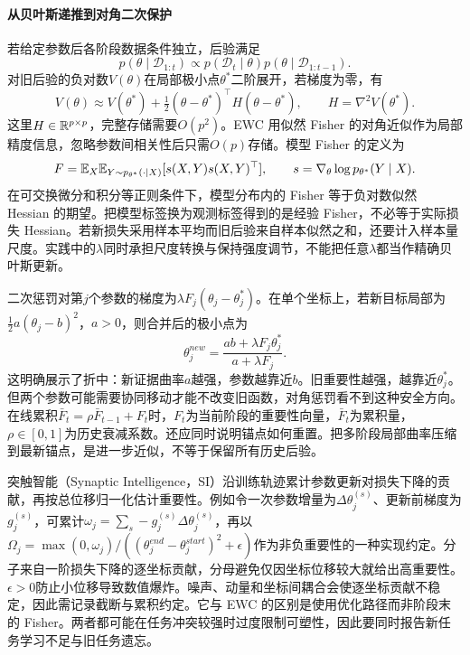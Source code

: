 \paragraph{从贝叶斯递推到对角二次保护}
若给定参数后各阶段数据条件独立，后验满足
\begin{equation}
 p(\theta\mid\mathcal D_{1:t})\propto p(\mathcal D_t\mid\theta)
 p(\theta\mid\mathcal D_{1:t-1}).
\end{equation}
对旧后验的负对数$V(\theta)$在局部极小点$\theta^*$二阶展开，若梯度为零，有
\begin{equation}
 V(\theta)\approx V(\theta^*)+\tfrac12(\theta-\theta^*)^\top H(\theta-\theta^*),
 \qquad H=\nabla^2V(\theta^*).
\end{equation}
这里$H\in\mathbb{R}^{p\times p}$，完整存储需要$O(p^2)$。EWC 用似然 Fisher 的对角近似作为局部精度信息，忽略参数间相关性后只需$O(p)$存储。模型 Fisher 的定义为
\begin{equation}
 F=\mathbb{E}_{X}\mathbb{E}_{Y\sim p_{\theta^*}(\cdot\mid X)}[s(X,Y)s(X,Y)^\top],
 \qquad s=\nabla_\theta\log p_{\theta^*}(Y\mid X).
\end{equation}
在可交换微分和积分等正则条件下，模型分布内的 Fisher 等于负对数似然 Hessian 的期望。把模型标签换为观测标签得到的是经验 Fisher，不必等于实际损失 Hessian。若新损失采用样本平均而旧后验来自样本似然之和，还要计入样本量尺度。实践中的$\lambda$同时承担尺度转换与保持强度调节，不能把任意$\lambda$都当作精确贝叶斯更新。

二次惩罚对第$j$个参数的梯度为$\lambda F_j(\theta_j-\theta_j^*)$。在单个坐标上，若新目标局部为$\tfrac12a(\theta_j-b)^2$，$a>0$，则合并后的极小点为
\begin{equation}
 \theta_j^{new}=\frac{ab+\lambda F_j\theta_j^*}{a+\lambda F_j}.
\end{equation}
这明确展示了折中：新证据曲率$a$越强，参数越靠近$b$。旧重要性越强，越靠近$\theta_j^*$。但两个参数可能需要协同移动才能不改变旧函数，对角惩罚看不到这种安全方向。在线累积$\bar F_t=\rho\bar F_{t-1}+F_t$时，$F_t$为当前阶段的重要性向量，$\bar F_t$为累积量，$\rho\in[0,1]$为历史衰减系数。还应同时说明锚点如何重置。把多阶段局部曲率压缩到最新锚点，是进一步近似，不等于保留所有历史后验。

突触智能（Synaptic Intelligence，SI）沿训练轨迹累计参数更新对损失下降的贡献，再按总位移归一化估计重要性\cite{zenke2017si}。例如令一次参数增量为$\Delta\theta_j^{(s)}$、更新前梯度为$g_j^{(s)}$，可累计$\omega_j=\sum_s-g_j^{(s)}\Delta\theta_j^{(s)}$，再以$\Omega_j=\max(0,\omega_j)/((\theta_j^{end}-\theta_j^{start})^2+\epsilon)$作为非负重要性的一种实现约定。分子来自一阶损失下降的逐坐标贡献，分母避免仅因坐标位移较大就给出高重要性。$\epsilon>0$防止小位移导致数值爆炸。噪声、动量和坐标间耦合会使逐坐标贡献不稳定，因此需记录截断与累积约定。它与 EWC 的区别是使用优化路径而非阶段末的 Fisher。两者都可能在任务冲突较强时过度限制可塑性，因此要同时报告新任务学习不足与旧任务遗忘。

